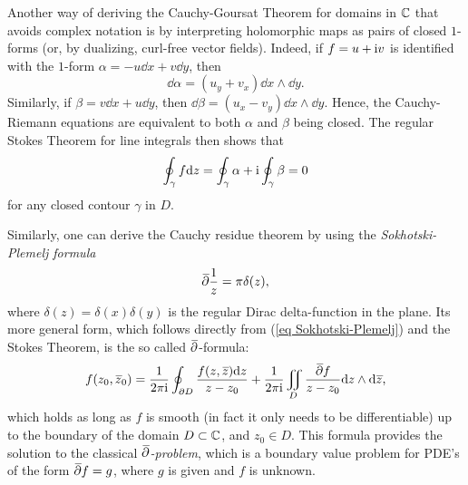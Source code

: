 \begin{rem}
    Another way of deriving the Cauchy-Goursat Theorem for domains in $\mathbb{C}$ that avoids complex notation is by interpreting holomorphic maps as pairs of closed $1$-forms (or, by dualizing, curl-free vector fields). Indeed, if $f=u+\mathrm{i} v$ is identified with the $1$-form $\alpha=-u\dd x+v\dd y$, then 
    \[\dd\alpha=(u_y+v_x)\dd x\wedge\dd y.\]
    Similarly, if $\beta=v\dd x+u\dd y$, then $\dd \beta=(u_x-v_y)\dd x\wedge\dd y$. Hence, the Cauchy-Riemann equations are equivalent to both $\alpha$ and $\beta$ being closed. The regular Stokes Theorem for line integrals then shows that 
    \[\oint_\gamma f{\mathrm{d}} z=\oint_\gamma\alpha+\mathrm{i} \oint_\gamma \beta=0\] for any closed contour $\gamma$ in $D$.
\end{rem}

\begin{rem}
    Similarly, one can derive the Cauchy residue theorem by using the \emph{Sokhotski-Plemelj formula} 
    \[\wb\partial \frac{1}{z}=\pi \delta(z),\label{eq Sokhotski-Plemelj}\] where $\delta(z)=\delta(x)\delta(y)$ is the regular Dirac delta-function in the plane. Its more general form, which follows directly from (\ref{eq Sokhotski-Plemelj}) and the Stokes Theorem, is the so called $\wb\partial$-formula:
    \[f(z_0,\wb{z}_0)=\frac{1}{2\pi \i}\oint_{\partial D}\frac{f(z,\wb{z})\dd z}{z-z_0}+\frac{1}{2\pi\i}\iint_D \frac{\wb\partial f}{z-z_0}\dd z\wedge\dd\wb{z},\]
    which holds as long as $f$ is smooth (in fact it only needs to be differentiable) up to the boundary of the domain $D\subset\mathbb{C}$, and $z_0\in D$.
    This formula provides the solution to the classical \emph{$\wb\partial$-problem}, which is a boundary value problem for PDE's of the form $\wb\partial f=g$, where $g$ is given and $f$ is unknown.
\end{rem}

